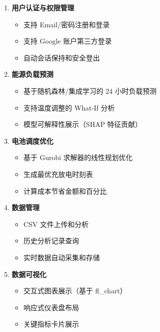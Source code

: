 \begin{enumerate}
    \item \textbf{用户认证与权限管理}
          \begin{itemize}
              \item 支持 Email/密码注册和登录
              \item 支持 Google 账户第三方登录
              \item 自动会话保持和安全登出
          \end{itemize}

    \item \textbf{能源负载预测}
          \begin{itemize}
              \item 基于随机森林/集成学习的 24 小时负载预测
              \item 支持温度调整的 What-If 分析
              \item 模型可解释性展示（SHAP 特征贡献）
          \end{itemize}

    \item \textbf{电池调度优化}
          \begin{itemize}
              \item 基于 Gurobi 求解器的线性规划优化
              \item 生成最优充放电时刻表
              \item 计算成本节省金额和百分比
          \end{itemize}

    \item \textbf{数据管理}
          \begin{itemize}
              \item CSV 文件上传和分析
              \item 历史分析记录查询
              \item 实时数据自动采集和存储
          \end{itemize}

    \item \textbf{数据可视化}
          \begin{itemize}
              \item 交互式图表展示（基于 fl\_chart）
              \item 响应式仪表盘布局
              \item 关键指标卡片展示
          \end{itemize}
\end{enumerate}

